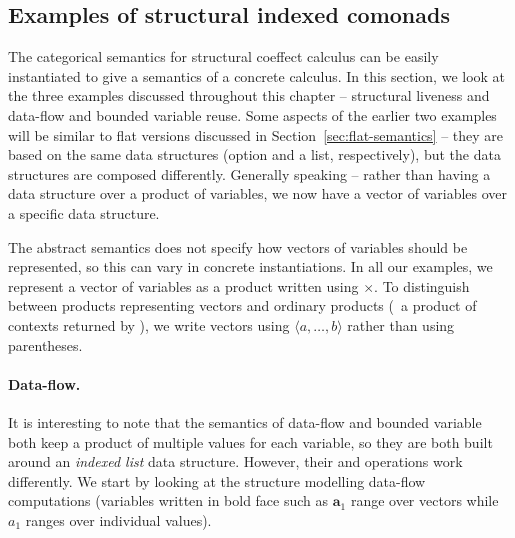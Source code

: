 \subsection{Examples of structural indexed comonads}
\label{sec:struct-semantics-examples}

The categorical semantics for structural coeffect calculus can be easily instantiated to give
a semantics of a concrete calculus. In this section, we look at the three examples discussed
throughout this chapter -- structural liveness and data-flow and bounded variable reuse. 
Some aspects of the earlier two examples will be similar to flat versions discussed in
Section~\ref{sec:flat-semantics} -- they are based on the same data structures (option and a 
list, respectively), but the data structures are composed differently. Generally speaking -- 
rather than having a data structure over a product of variables, we now have 
a vector of variables over a specific data structure.

The abstract semantics does not specify how vectors of variables should be represented, so this can
vary in concrete instantiations. In all our examples, we represent a vector of variables as a 
product written using $\times$. To distinguish between products representing vectors and ordinary
products (\eg~a product of contexts returned by ), we write vectors using 
$\langle a, \ldots, b \rangle$ rather than using parentheses.

\paragraph{Data-flow.}
It is interesting to note that the semantics of data-flow and bounded variable both keep
a product of multiple values for each variable, so they are both built around an \emph{indexed list}
data structure. However, their  and  operations work differently. We start
by looking at the structure modelling data-flow computations (variables written in bold face such
as $\mathbf{a}_1$ range over vectors while $a_1$ ranges over individual values).

